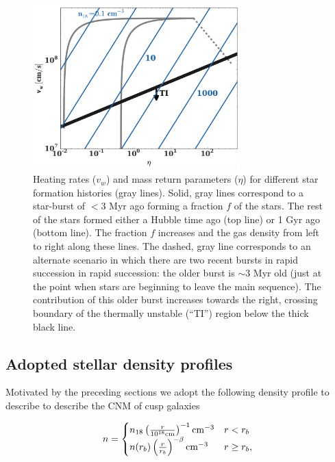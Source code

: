 \documentclass[usenatbib,fleqn]{mn2e}
\begin{document}
\begin{figure} 
  \includegraphics[width=8cm]{cnm_plot.pdf}
  \caption{\label{fig:param} Heating rates ($v_w$) and mass return
    parameters ($\eta$) for different star formation histories (gray
    lines). Solid, gray lines correspond to a star-burst of $<3$ Myr
    ago forming a fraction $f$ of the stars. The rest of the stars
    formed either a Hubble time ago (top line) or 1 Gyr ago (bottom
    line). The fraction $f$ increases and the gas density from left to
    right along these lines. The dashed, gray line corresponds to an
    alternate scenario in which there are two recent bursts in rapid
    succession in rapid succession: the older burst is $\sim 3$ Myr
    old (just at the point when stars are beginning to leave the main
    sequence). The contribution of this older burst increases towards
    the right, crossing boundary of the thermally unstable (``TI'')
    region below the thick black line.}
\end{figure}


 


\subsection{Adopted stellar density profiles}
 Motivated by the preceding sections we adopt the following density
 profile to describe to describe the CNM of cusp galaxies

\begin{align}
n=
\begin{cases}
  n_{18} \left(\frac{r}{10^{18} {\rm cm}}\right)^{-1} {\rm cm^{-3}} & r<r_b \\
  n(r_b) \left(\frac{r}{r_b}\right)^{-\beta} {\rm cm^{-3}} & r\geq
  r_b,\\
  \label{eq:profile}
\end{cases}
\end{align}
\end{document}
